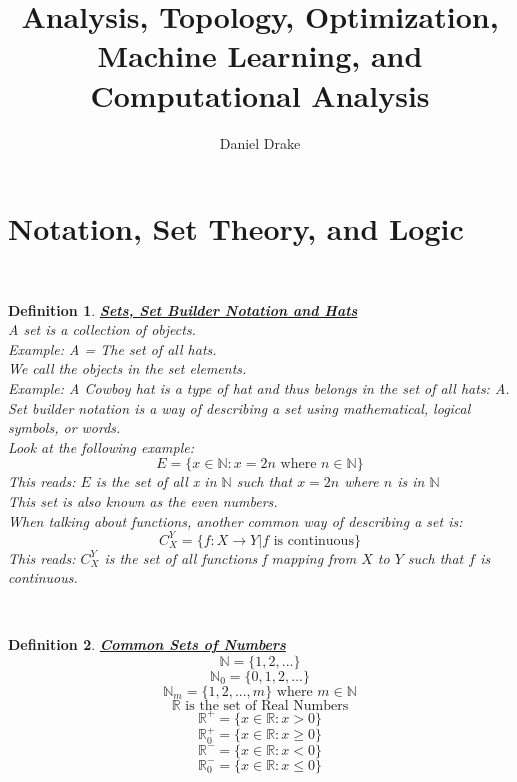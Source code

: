 \documentclass[12pt]{extarticle}
\title{Analysis, Topology, Optimization, Machine Learning, and Computational Analysis}
\author{Daniel Drake}
\theoremstyle{plain}
\theoremstyle{plain}
\theoremstyle{plain}
\theoremstyle{Definition}
\newtheorem{def.}{Definition}[section]
\theoremstyle{Definition}
\theoremstyle{plain}
\theoremstyle{plain}
\newcommand{\cut}[0]{\noindent\framebox[\linewidth]{\rule{\linewidth}{2pt}}\\}
\begin{document}
\maketitle			
\section{Notation, Set Theory, and Logic}
\cut
\begin{def.} \underline{\textbf{Sets, Set Builder Notation and Hats}} \\ 
	A set is a collection of objects. \\ 
	Example: A = The set of all hats. \\ 
	We call the objects in the set elements. \\ 
	Example: A Cowboy hat is a type of hat and thus belongs in the set of all hats: A. \\
	
	Set builder notation is a way of describing a set using mathematical, logical symbols, or words. \\
	Look at the following example: \\ 
	$$E = \{x \in \mathbb{N}: x = 2n \text{ where } n \in \mathbb{N}\}$$
	This reads: $E$ is the set of all x in $\mathbb{N}$ such that $x = 2n$ where $n$ is in $\mathbb{N}$ \\
	This set is also known as the even numbers. \\
	When talking about functions, another common way of describing a set is: 
	$$C_X^Y = \{f : X \to Y | f \text{ is continuous} \}$$
	This reads: $C_X^Y$ is the set of all functions f mapping from $X$ to $Y$ such that $f$ is continuous. 
\end{def.}
\cut
\begin{def.} \underline{\textbf{Common Sets of Numbers}} \\ 
	$$\mathbb{N} = \{1,2,...\}$$	
	$$\mathbb{N}_0 = \{0,1,2,...\}$$
	$$\mathbb{N}_m = \{1,2,...,m\} \text{ where } m \in \mathbb{N}$$
	$$\mathbb{R} \text{ is the set of Real Numbers}$$
	$$\mathbb{R}^+ = \{x \in \mathbb{R} : x > 0\}$$
	$$\mathbb{R}_0^+ = \{x \in \mathbb{R} : x \geq 0\}$$
	$$\mathbb{R}^- = \{x \in \mathbb{R} : x < 0\}$$
	$$\mathbb{R}_0^- = \{x \in \mathbb{R} : x \leq 0\}$$
\end{def.}
\cut
\end{document}
